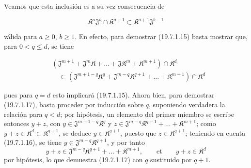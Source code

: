 Veamos que esta inclusión es a su vez consecuencia de
\begin{env}[19.7.1.16]
\label{IV.19.7.1.16}
\[
  \mathfrak K^a\mathfrak J^b\cap\mathfrak K^{a+1}\subset\mathfrak K^{a+1}\mathfrak J^{b-1}
\]
\end{env}
válida para $a\geq0$, $b\geq1$. En efecto, para demostrar (19.7.1.15) basta mostrar que, para $0<q\leq d$, se tiene
\begin{env}[19.7.1.17]
\label{IV.19.7.1.17}
\[
\begin{aligned}
  &(\mathfrak J^{m+1}+\mathfrak J^m\mathfrak K+\ldots+\mathfrak J\mathfrak K^m+\mathfrak K^{m+1})\cap\mathfrak K^d\\
  &\quad\subset(\mathfrak J^{m+1-q}\mathfrak K^q+\mathfrak J^{m-q}\mathfrak K^{q+1}+\ldots+\mathfrak K^{m+1})\cap\mathfrak K^d
\end{aligned}
\]
\end{env}
pues para $q=d$ esto implicará (19.7.1.15). Ahora bien, para demostrar (19.7.1.17), basta proceder por inducción sobre $q$, suponiendo verdadera la relación para $q<d$; por hipótesis, un elemento del primer miembro se escribe entonces $y+z$, con $y\in\mathfrak J^{m+1-q}\mathfrak K^q$ y $z\in\mathfrak J^{m-q}\mathfrak K^{q+1}+\ldots+\mathfrak K^{m+1}$; como $y+z\in\mathfrak K^d\subset\mathfrak K^{q+1}$, se deduce $y\in\mathfrak K^{q+1}$, puesto que $z\in\mathfrak K^{q+1}$; teniendo en cuenta (19.7.1.16), se tiene $y\in\mathfrak J^{m-q}\mathfrak K^{q+1}$, y por tanto
\[
  y+z\in\mathfrak J^{m-q}\mathfrak K^{q+1}+\ldots+\mathfrak K^{m+1},\qquad\text{et}\qquad y+z\in\mathfrak K^d
\]
por hipótesis, lo que demuestra (19.7.1.17) con $q$ sustituido por $q+1$.

